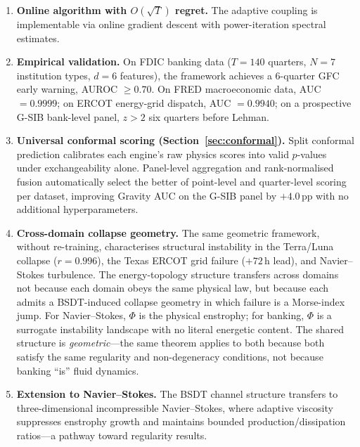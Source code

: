 \documentclass[final]{siamltex}
\begin{document}
\begin{enumerate}
\item \textbf{Online algorithm with $O(\sqrt{T})$ regret.} The
  adaptive coupling is implementable via online gradient descent
  with power-iteration spectral estimates.

\item \textbf{Empirical validation.} On FDIC banking data
  ($T=140$ quarters, $N=7$ institution types, $d=6$ features), the
  framework achieves a 6-quarter GFC early warning, AUROC $\ge
  0.70$.  On FRED macroeconomic data, AUC $= 0.9999$; on ERCOT
  energy-grid dispatch, AUC $= 0.9940$; on a prospective G-SIB
  bank-level panel, $z > 2$ six quarters before Lehman.

\item \textbf{Universal conformal scoring
  (Section~\ref{sec:conformal}).}  Split conformal prediction
  calibrates each engine's raw physics scores into valid
  $p$-values under exchangeability alone.  Panel-level
  aggregation and rank-normalised fusion automatically select
  the better of point-level and quarter-level scoring per
  dataset, improving Gravity AUC on the G-SIB panel by
  $+4.0$\,pp with no additional hyperparameters.

\item \textbf{Cross-domain collapse geometry.} The same geometric
  framework, without re-training, characterises structural
  instability in the Terra/Luna collapse ($r=0.996$),
  the Texas ERCOT grid failure ($+72$\,h lead), and
  Navier--Stokes turbulence.  The energy-topology
  structure transfers across domains not because each domain obeys
  the same physical law, but because each admits a BSDT-induced
  collapse geometry in which failure is a Morse-index jump.
  For Navier--Stokes, $\Phi$ is the physical enstrophy;
  for banking, $\Phi$ is a surrogate instability landscape with
  no literal energetic content.  The shared structure is
  \emph{geometric}---the same theorem applies to both because both
  satisfy the same regularity and non-degeneracy conditions, not
  because banking ``is'' fluid dynamics.

\item \textbf{Extension to Navier--Stokes.} The BSDT channel
  structure transfers to three-dimensional incompressible
  Navier--Stokes, where adaptive viscosity suppresses enstrophy
  growth and maintains bounded production/dissipation ratios---a
  pathway toward regularity results.
\end{enumerate}
\end{document}
